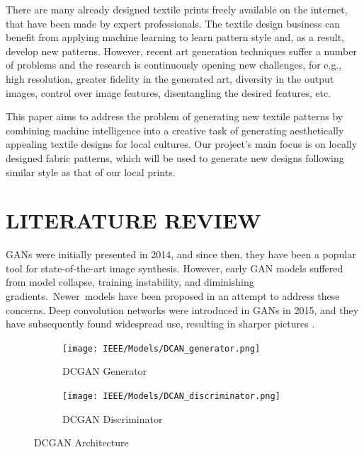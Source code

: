 \documentclass[conference]{IEEEtran}
\begin{document}
There are many already designed textile prints freely available on the internet, that have been made by expert professionals. The textile design business can benefit from applying machine learning to learn pattern style and, as a result, develop new patterns. However, recent art generation techniques suffer a number of problems and the research is continuously opening new challenges, for e.g., high resolution, greater fidelity in the generated art, diversity in the output images, control over image features, disentangling the desired features, etc.

This paper aims to address the problem of generating new textile patterns by combining machine intelligence into a creative task of generating aesthetically appealing textile designs for local cultures. Our project's main focus is on locally designed fabric patterns, which will be used to generate new designs following similar style as that of our local prints.

\section{LITERATURE REVIEW}
GANs were initially presented in 2014, and since then, they have been a popular tool for state-of-the-art image synthesis. However, early GAN models suffered from model collapse, training instability, and diminishing gradients. Newer models have been proposed in an attempt to address these concerns. Deep convolution networks were introduced in GANs in 2015, and they have subsequently found widespread use, resulting in sharper pictures \cite{b13}.

\begin{figure}[ht]
\begin{subfigure}{.5\textwidth}
  \centering
  \texttt{[image: IEEE/Models/DCAN\_generator.png]}  
  \caption{DCGAN Generator}
  \label{fig:sub-first}
\end{subfigure}
\begin{subfigure}{.5\textwidth}
  \centering
  \texttt{[image: IEEE/Models/DCAN\_discriminator.png]}  
  \caption{DCGAN Discriminator}
  \label{fig:sub-second}
\end{subfigure}
\caption{DCGAN Architecture}
\label{fig:fig}
\end{figure}
\end{document}
